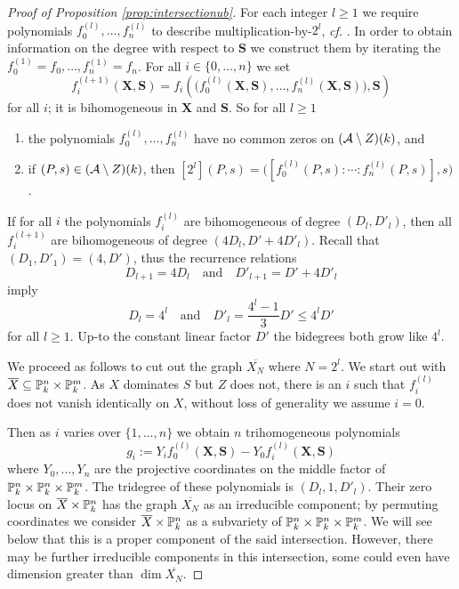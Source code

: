 \begin{proof}[Proof of Proposition \ref{prop:intersectionub}]
For each integer $l\ge 1$ we require polynomials
$f^{(l)}_0,\ldots,f^{(l)}_n$ to describe multiplication-by-$2^l$,
\textit{cf.} \cite[$\mathsection$9]{GaoHab}. In order to obtain information on the
degree with respect to $\mathbf{S}$ we construct them by iterating
the $f^{(1)}_0=f_0,\ldots,f^{(1)}_n=f_n$.
For all $i\in \{0,\ldots,n\}$  we set
\begin{equation*}
  f^{(l+1)}_i(\mathbf{X},\mathbf{S}) = f_i\left(\bigl(f^{(l)}_0(\mathbf{X},\mathbf{S}),\ldots,f^{(l)}_n(\mathbf{X},\mathbf{S})\bigr),\mathbf{S}\right)
\end{equation*}
 for all $i$; it is bihomogeneous in
$\mathbf{X}$ and $\mathbf{S}$. 
So for all $l\ge 1$ 
\begin{enumerate}
 \item [(i)] the polynomials $f^{(l)}_0,\ldots,f^{(l)}_n$ have no common zeros on
 $(\mathcal{A}\setminus Z)(k)$, and 
 \item[(ii)]  if   $(P,s)\in(\mathcal{A}\setminus Z)(k)$, then $[2^l](P,s) = \bigl([f^{(l)}_0(P,s):\cdots : f^{(l)}_n(P,s)],s\bigr)$. 
\end{enumerate}


If for all $i$ the polynomials $f^{(l)}_i$ are bihomogeneous of degree
$(D_{l},D'_{l})$, then all $f^{(l+1)}_i$ are bihomogeneous of degree
$(4D_{l},D'+4D'_{l})$. Recall that
$(D_1,D'_1)=(4,D')$, thus the recurrence
relations
$$ D_{l+1}=4D_l  \quad\text{and}\quad D'_{l+1} = D' + 4D'_{l} $$
imply
\begin{equation}
  \label{eq:DlprimeDlbound}
  D_l = 4^l \quad\text{and}\quad   D'_l = \frac{4^l-1}{3}D'\le 4^lD'
\end{equation}
for all $l\ge 1$.
Up-to the constant linear factor $D'$ the bidegrees both
grow like $4^l$.


We proceed as follows to cut out the graph $\overline{X_{N}}$ where
$N=2^l$. 
We start out with $\overline X\subseteq{\mathbb{P}}_k^n\times{\mathbb{P}}_k^m$. 
As $X$ dominates $S$ but $Z$ does not, there is an $i$ such that 
$f_i^{(l)}$  does not
vanish identically on $X$, without loss of generality we assume $i=0$. 


Then as $i$ varies over $\{1,\ldots,n\}$ we obtain $n$ trihomogeneous
polynomials 
\begin{equation*}
g_i :=  Y_i f_0^{(l)}(\mathbf{X},\mathbf{S}) - Y_0   f_i^{(l)}(\mathbf{X},\mathbf{S})
\end{equation*}
where $Y_0,\ldots,Y_n$ are the projective coordinates on the middle factor of ${\mathbb{P}}_k^n\times{\mathbb{P}}_k^n\times{\mathbb{P}}_k^m$. 
The tridegree of these polynomials is $(D_l,1,D'_l)$. %
Their zero locus on $\overline X\times{\mathbb{P}}_k^n$ has the graph
$\overline{X_N}$ as an irreducible component;
by permuting coordinates we consider $\overline X\times{\mathbb{P}}_k^n$ as a
subvariety of ${\mathbb{P}}_k^n\times{\mathbb{P}}_k^n\times{\mathbb{P}}_k^m$.
We will see below that this is a proper component of the said
intersection. 
However, there may be further irreducible components in this
intersection,  some could even have dimension greater than $\dim
\overline{X_N}$.


\end{proof}
